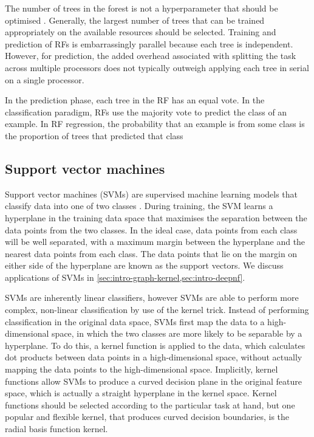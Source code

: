 The number of trees in the forest is not a hyperparameter that should be optimised \cite{Probst2018}. Generally, the largest number of trees that can be trained appropriately on the available resources should be selected. Training and prediction of RFs is embarrassingly parallel because each tree is independent. However, for prediction, the added overhead associated with splitting the task across multiple processors does not typically outweigh applying each tree in serial on a single processor.

In the prediction phase, each tree in the RF has an equal vote. In the classification paradigm, RFs use the majority vote to predict the class of an example. In RF regression, the probability that an example is from some class is the proportion of trees that predicted that class

\subsection{Support vector machines}
\label{sec:intro-svm}

Support vector machines (SVMs) are supervised machine learning models that classify data into one of two classes \cite{Cristianini2004}.
During training, the SVM learns a hyperplane in the training data space that maximises the separation between the data points from the two classes.
In the ideal case, data points from each class will be well separated, with a maximum margin between the hyperplane and the nearest data points from each class.
The data points that lie on the margin on either side of the hyperplane are known as the support vectors.
We discuss applications of SVMs in \ref{sec:intro-graph-kernel,sec:intro-deepnf}.

SVMs are inherently linear classifiers, however SVMs are able to perform more complex, non-linear classification by use of the kernel trick.
Instead of performing classification in the original data space, SVMs first map the data to a high-dimensional space, in which the two classes are more likely to be separable by a hyperplane.
To do this, a kernel function is applied to the data, which calculates dot products between data points in a high-dimensional space, without actually mapping the data points to the high-dimensional space.
Implicitly, kernel functions allow SVMs to produce a curved decision plane in the original feature space, which is actually a straight hyperplane in the kernel space.
Kernel functions should be selected according to the particular task at hand, but one popular and flexible kernel, that produces curved decision boundaries, is the radial basis function kernel.

